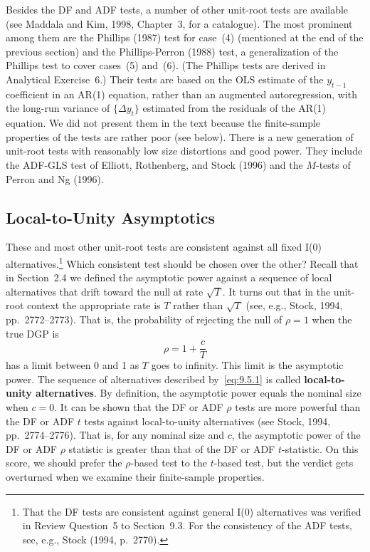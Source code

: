 
Besides the DF and ADF tests, a number of other unit-root tests are available (see
Maddala and Kim, 1998, Chapter~3, for a catalogue). The most prominent among
them are the Phillips (1987) test for case~(4) (mentioned at the end of the previous
section) and the Phillips-Perron (1988) test, a generalization of the Phillips test
to cover cases~(5) and~(6). (The Phillips tests are derived in Analytical Exercise~6.)
Their tests are based on the OLS estimate of the $y_{t-1}$ coefficient in an AR(1)
equation, rather than an augmented autoregression, with the long-run variance of
$\{\Delta y_t\}$ estimated from the residuals of the AR(1) equation. We did not present
them in the text because the finite-sample properties of the tests are rather poor
(see below). There is a new generation of unit-root tests with reasonably low size
distortions and good power. They include the ADF-GLS test of Elliott, Rothenberg,
and Stock (1996) and the $M$-tests of Perron and Ng (1996).

\subsection*{Local-to-Unity Asymptotics}

These and most other unit-root tests are consistent against all fixed I(0) alternatives.\footnote{That the DF tests are consistent against general I(0) alternatives was verified in Review Question~5 to Section~9.3. For the consistency of the ADF tests, see, e.g., Stock (1994, p.~2770).} Which consistent test should be chosen over the other? Recall that in
Section~2.4 we defined the asymptotic power against a sequence of local alternatives that drift toward the null at rate $\sqrt{T}$. It turns out that in the unit-root context
the appropriate rate is $T$ rather than $\sqrt{T}$ (see, e.g., Stock, 1994, pp.~2772--2773).
That is, the probability of rejecting the null of $\rho = 1$ when the true DGP is
\begin{equation}
\label{eq:9.5.1}
\rho = 1 + \frac{c}{T}
\end{equation}
has a limit between 0 and 1 as $T$ goes to infinity. This limit is the asymptotic
power. The sequence of alternatives described by~\eqref{eq:9.5.1} is called \textbf{local-to-unity
alternatives}. By definition, the asymptotic power equals the nominal size when
$c = 0$. It can be shown that the DF or ADF $\rho$ tests are more powerful than the
DF or ADF $t$ tests against local-to-unity alternatives (see Stock, 1994, pp.~2774--2776). That is, for any nominal size and $c$, the asymptotic power of the DF or ADF
$\rho$ statistic is greater than that of the DF or ADF $t$-statistic. On this score, we should
prefer the $\rho$-based test to the $t$-based test, but the verdict gets overturned when we
examine their finite-sample properties.

